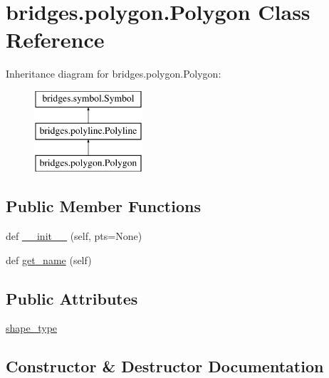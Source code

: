 \hypertarget{classbridges_1_1polygon_1_1_polygon}{}\section{bridges.\+polygon.\+Polygon Class Reference}
\label{classbridges_1_1polygon_1_1_polygon}
Inheritance diagram for bridges.\+polygon.\+Polygon\+:\begin{figure}[H]
\begin{center}
\leavevmode
\includegraphics[height=3.000000cm]{classbridges_1_1polygon_1_1_polygon}
\end{center}
\end{figure}
\subsection*{Public Member Functions}
\begin{DoxyCompactItemize}
\item 
def \hyperlink{classbridges_1_1polygon_1_1_polygon_a6e2515889df5d8626a32de2d4b36abc1}{\+\_\+\+\_\+init\+\_\+\+\_\+} (self, pts=None)
\item 
def \hyperlink{classbridges_1_1polygon_1_1_polygon_afa0d94f62a19b24ad3764bc900718346}{get\+\_\+name} (self)
\end{DoxyCompactItemize}
\subsection*{Public Attributes}
\begin{DoxyCompactItemize}
\item 
\hyperlink{classbridges_1_1polygon_1_1_polygon_ae9c67cb9337ec5deebf1e334e84b3635}{shape\+\_\+type}
\end{DoxyCompactItemize}


\subsection{Constructor \& Destructor Documentation}
\mbox{\label{classbridges_1_1polygon_1_1_polygon_a6e2515889df5d8626a32de2d4b36abc1}} 
